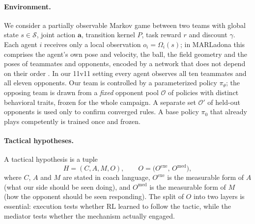 \documentclass[11pt]{article}
\newcommand{\opp}{\mathcal{O}}           %
\begin{document}
\paragraph{Environment.}
We consider a partially observable Markov game between two teams with global state $s\in\mathcal{S}$, joint action $\mathbf{a}$, transition kernel $P$, task reward $r$ and discount $\gamma$.
Each agent $i$ receives only a local observation $o_i = \Omega_i(s)$; in MARLadona this comprises the agent's own pose and velocity, the ball, the field geometry and the poses of teammates and opponents, encoded by a network that does not depend on their order \citep{li2025marladona}.
In our 11v11 setting every agent observes all ten teammates and all eleven opponents.
Our team is controlled by a parameterized policy $\pi_\theta$; the opposing team is drawn from a \emph{fixed} opponent pool $\opp$ of policies with distinct behavioral traits, frozen for the whole campaign.
A separate set $\opp'$ of held-out opponents is used only to confirm converged rules.
A base policy $\pi_0$ that already plays competently is trained once and frozen.

\paragraph{Tactical hypotheses.}
A tactical hypothesis is a tuple
\begin{equation}
  H = (C, A, M, O), \qquad O = \bigl(O^{\mathrm{exe}},\, O^{\mathrm{med}}\bigr),
\end{equation}
where $C$, $A$ and $M$ are stated in coach language, $O^{\mathrm{exe}}$ is the measurable form of $A$ (what our side should be seen doing), and $O^{\mathrm{med}}$ is the measurable form of $M$ (how the opponent should be seen responding).
The split of $O$ into two layers is essential: execution tests whether RL learned to follow the tactic, while the mediator tests whether the mechanism actually engaged.
\end{document}
